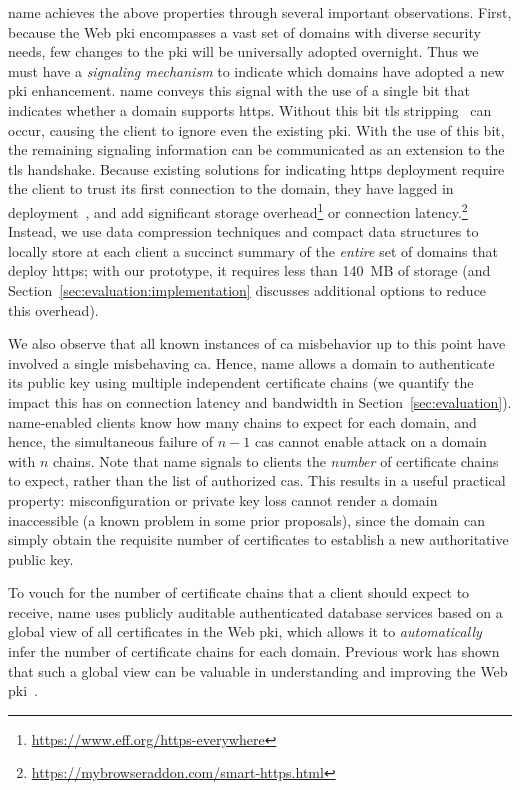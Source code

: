 \ac{name} achieves the above properties through several important observations.
First, because the Web \ac{pki} encompasses a vast set of domains with diverse
security needs, few changes to the \ac{pki} will be universally adopted
overnight. Thus we must have a \emph{signaling mechanism} to indicate which
domains have adopted a new \ac{pki} enhancement. \ac{name} conveys this signal
with the use of a single bit that indicates whether a domain supports
\ac{https}. Without this bit \ac{tls} stripping~\cite{marlinspike2009new} can
occur, causing the client to ignore even the existing \ac{pki}. With the use of
this bit, the remaining signaling information can be communicated as an
extension to the \ac{tls} handshake. Because existing solutions for indicating
\ac{https} deployment require the client to trust its first connection to the
domain, they have lagged in deployment~\cite{rfc4033, rfc6698}, and add
significant storage overhead\footnote{\url{https://www.eff.org/https-everywhere}}
or connection
latency.\footnote{\url{https://mybrowseraddon.com/smart-https.html}} Instead, we
use data compression techniques and compact data structures to locally store at
each client a succinct summary of the \emph{entire} set of domains that deploy
\ac{https}; with our prototype, it requires less than 140~MB of storage
(and Section~\ref{sec:evaluation:implementation} discusses additional options 
to reduce this overhead).

We also observe that all known instances of \ac{ca} misbehavior up to this point
have involved a single misbehaving \ac{ca}.  Hence, \ac{name} allows a domain to
authenticate its public key using multiple independent certificate chains (we
quantify the impact this has on connection latency and bandwidth in
Section~\ref{sec:evaluation}). \ac{name}-enabled clients know how many chains to
expect for each domain, and hence, the simultaneous failure of $n-1$ \acp{ca}
cannot enable  attack on a domain with $n$ chains. Note that \ac{name}
signals to clients the \emph{number} of certificate chains to expect, rather
than the list of authorized \acp{ca}.  This results in a useful practical
property: misconfiguration or private key loss cannot render a domain
inaccessible (a known problem in some prior proposals), 
since the domain can simply obtain the requisite number of
certificates to establish a new authoritative public key.

To vouch for the number of certificate chains that a client should expect to
receive, \ac{name} uses publicly auditable authenticated database services based
on a global view of all certificates in the Web \ac{pki}, which allows it to
\emph{automatically} infer the number of certificate chains for each domain.
Previous work has shown that such a global view can be valuable in understanding
and improving the Web \ac{pki}~\cite{durumeric2015search, larisch2017crlite}.

